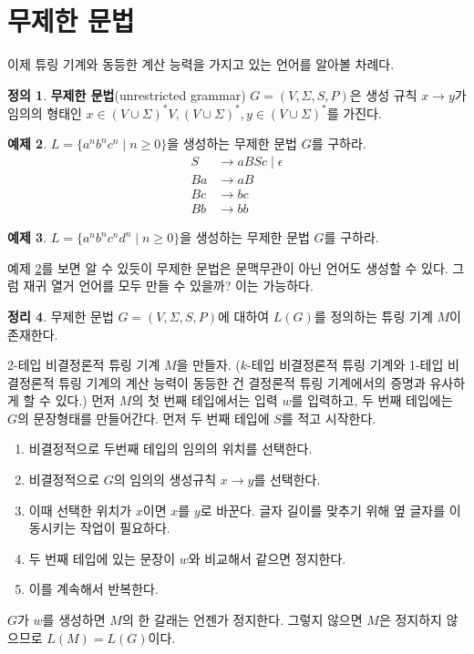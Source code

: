 \documentclass[b5paper, 10pt]{book}
\theoremstyle{definition}
\newtheorem{defn}{정의}[chapter]
\newtheorem{thm}[defn]{정리}
\newtheorem{ex}[defn]{예제}
\newenvironment{pf*}{\pushQED{\qed}\pf}{\popQED\endpf}
\begin{document}
\section{무제한 문법}
이제 튜링 기계와 동등한 계산 능력을 가지고 있는 언어를 알아볼 차례다. 
\begin{defn}
    \textbf{무제한 문법}(unrestricted grammar) $G = (V, \Sigma , S, P)$은 
    생성 규칙 $x \rightarrow y$가 임의의 형태인 $x \in (V \cup \Sigma)^* 
    V, (V \cup \Sigma)^*, y \in (V \cup \Sigma)^*$를 가진다.
\end{defn}
\begin{ex} \label{UG_ex}
    $L = \{a^n b^n c^n \;\vert\; n \ge 0\}$을 생성하는 무제한 문법 $G$를 구하라.
    \begin{align*}
        S &\rightarrow aBSc \;\vert\; \epsilon \\ 
        Ba &\rightarrow aB \\ 
        Bc &\rightarrow bc \\ 
        Bb &\rightarrow bb 
    \end{align*}
\end{ex}
\begin{ex}
    $L = \{a^n b^n c^n d^n \;\vert\; n \ge 0\}$을 생성하는 무제한 문법 $G$를 구하라.
\end{ex}
예제 \ref{UG_ex}를 보면 알 수 있듯이 무제한 문법은 문맥무관이 아닌 언어도 생성할 수 있다.
그럼 재귀 열거 언어를 모두 만들 수 있을까? 이는 가능하다.
\begin{thm}
    무제한 문법 $G = (V, \Sigma, S, P)$에 대하여 $L(G)$를 정의하는 튜링 기계 $M$이 존재한다.
\end{thm}
\begin{pf*}
    2-테입 비결정론적 튜링 기계 $M$을 만들자. ($k$-테입 비결정론적 튜링 기계와 
    1-테입 비결정론적 튜링 기계의 계산 능력이 동등한 건 결정론적 튜링 기계에서의 증명과
    유사하게 할 수 있다.) 먼저 $M$의 첫 번째 테입에서는 입력 $w$를 입력하고,
    두 번째 테입에는 $G$의 문장형태를 만들어간다. 먼저 두 번째 테입에
    $S$를 적고 시작한다.
    \begin{enumerate}
        \item 비결정적으로 두번째 테입의 임의의 위치를 선택한다.
        \item 비결정적으로 $G$의 임의의 생성규칙 $x \rightarrow y$를 선택한다.
        \item 이때 선택한 위치가 $x$이면 $x$를 $y$로 바꾼다. 글자 길이를
        맞추기 위해 옆 글자를 이동시키는 작업이 필요하다.
        \item 두 번째 테입에 있는 문장이 $w$와 비교해서 같으면 정지한다.
        \item 이를 계속해서 반복한다.
    \end{enumerate}
    $G$가 $w$를 생성하면 $M$의 한 갈래는 언젠가 정지한다. 그렇지 않으면
    $M$은 정지하지 않으므로 $L(M) = L(G)$이다.
\end{pf*}
\end{document}
